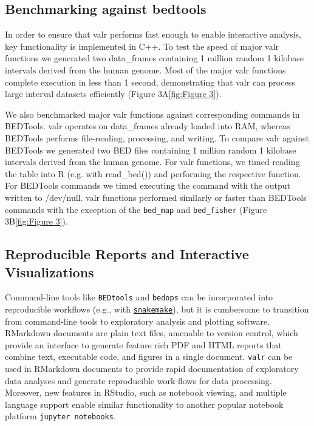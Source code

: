 \documentclass[9pt,a4paper]{extarticle}
\begin{document}
\subsection*{Benchmarking against bedtools}
In order to ensure that valr performs fast enough to enable interactive analysis, key functionality is implemented in C++. To test the speed of major valr functions we generated two data\_frames containing 1 million random 1 kilobase intervals derived from the human genome. Most of the major valr functions complete execution in less than 1 second, demonstrating that valr can process large interval datasets efficiently (Figure 3A\ref{fig:Figure 3}).

We also benchmarked major valr functions against corresponding commands in BEDTools. valr operates on data\_frames already loaded into RAM, whereas BEDTools performs file-reading, processing, and writing. To compare valr against BEDTools we generated two BED files containing 1 million random 1 kilobase intervals derived from the human genome. For valr functions, we timed reading the table into R (e.g. with read\_bed()) and performing the respective function. For BEDTools commands we timed executing the command with the output written to /dev/null. valr functions performed similarly or faster than BEDTools commands with the exception of the \texttt{bed\_map} and \texttt{bed\_fisher} (Figure 3B\ref{fig:Figure 3}).

\subsection{Reproducible Reports and Interactive Visualizations}
Command-line tools like \texttt{BEDtools} and \texttt{bedops} can be incorporated into reproducible workflows (e.g., with
\href{https://bitbucket.org/snakemake/snakemake/wiki/Home}{\texttt{snakemake}}\cite{koster_snakemakescalable_2012}),
but it is cumbersome to transition from command-line tools to exploratory analysis and plotting software. RMarkdown documents are plain text files, amenable to version control, which provide an interface to generate feature rich PDF and HTML reports that combine text, executable code, and figures in a single document. \texttt{valr} can be used in RMarkdown documents to provide rapid documentation of exploratory data analyses and generate reproducible work-flows for data processing.  Moreover, new features in RStudio, such as notebook viewing, and multiple language support enable similar functionality to another popular notebook platform \texttt{jupyter notebooks}.
\end{document}
